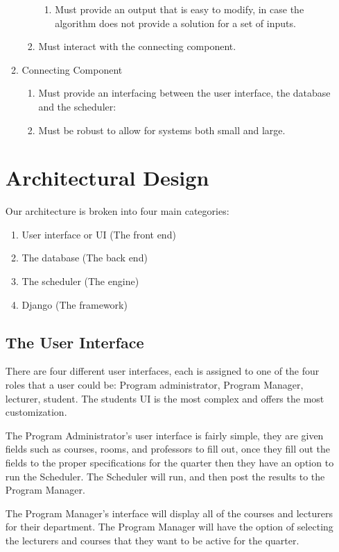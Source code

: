\documentclass[12pt]{article}
\begin{document}
\begin{enumerate}
\begin{enumerate}
\begin{enumerate}
\begin{enumerate}
	    \item Must provide an output that is easy to modify, in case the algorithm does not provide a solution for a set of inputs.
	    \end{enumerate}
	\item Must interact with the connecting component.
     \end{enumerate}
\item Connecting Component
      \begin{enumerate}
      \item Must provide an interfacing between the user interface, the database and the scheduler:
    \item Must be robust to allow for systems both small and large.
     \end{enumerate}
\end{enumerate}

\section{Architectural Design} %
Our architecture is broken into four main categories:
\begin{enumerate}
\item User interface or UI (The front end)
\item The database  (The back end)
\item The scheduler (The engine)
\item Django (The framework)
\end{enumerate}

\subsection{The User Interface}
There are four different user interfaces, each is assigned to one of the four roles that a user could be: Program administrator, Program Manager, lecturer, student. The students UI is the most complex and offers the most customization.

The Program Administrator's user interface is fairly simple, they are given fields such as courses, rooms, and professors to fill out, once they fill out the fields to the proper specifications for the quarter then they have an option to run the Scheduler. The Scheduler will run, and then post the results to the Program Manager.

The Program Manager's interface will display all of the courses and lecturers for their department. The Program Manager will have the option of selecting the lecturers and courses that they want to be active for the quarter.


\end{enumerate}
\end{document}
